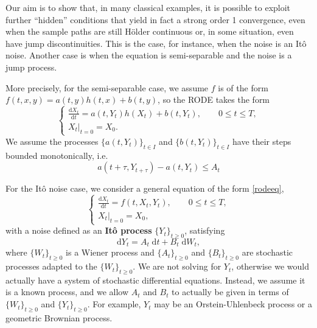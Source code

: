 \documentclass[reqno,12pt]{amsart}
\theoremstyle{plain}%
\theoremstyle{definition}
\begin{document}
Our aim is to show that, in many classical examples, it is possible to exploit further ``hidden'' conditions that yield in fact a strong order 1 convergence, even when the sample paths are still H\"older continuous or, in some situation, even have jump discontinuities. This is the case, for instance, when the noise is an It\^o noise. Another case is when the equation is semi-separable and the noise is a jump process.

More precisely, for the semi-separable case, we assume $f$ is of the form $f(t, x, y) = a(t, y)h(t, x) + b(t, y)$, so the RODE takes the form
\begin{equation}
    \label{semiseparablerodeeq}
    \begin{cases}
        \displaystyle \frac{\mathrm{d}X_t}{\mathrm{d} t} = a(t, Y_t) h(X_t) + b(t, Y_t), \qquad 0 \leq t \leq T, \\
        \left. X_t \right|_{t = 0} = X_0.
    \end{cases}
\end{equation}
We assume the processes $\{a(t, Y_t)\}_{t\in I}$ and $\{b(t, Y_t)\}_{t\in I}$ have their steps bounded monotonically, i.e.
\[
a(t+\tau, Y_{t+\tau}) - a(t, Y_t) \leq A_t
\]



For the It\^o noise case, we consider a general equation of the form \eqref{rodeeq},
\begin{equation}
    \begin{cases}
      \displaystyle \frac{\mathrm{d}X_t}{\mathrm{d} t} = f(t, X_t, Y_t), \qquad 0 \leq t \leq T, \\
      \left. X_t \right|_{t = 0} = X_0,
    \end{cases}
  \end{equation}
with a noise defined as an \textbf{It\^o process} $\{Y_t\}_{t\geq 0}$, satisfying
\begin{equation}
  \label{itoprocess}
  \mathrm{d}Y_t = A_t \;\mathrm{d}t + B_t \;\mathrm{d}W_t,
\end{equation}
where $\{W_t\}_{t\geq 0}$ is a Wiener process and $\{A_t\}_{t \geq 0}$ and $\{B_t\}_{t \geq 0}$ are stochastic processes adapted to the $\{W_t\}_{t\geq 0}$. We are not solving for $Y_t$, otherwise we would actually have a system of stochastic differential equations. Instead, we assume it is a known process, and we allow $A_t$ and $B_t$ to actually be given in terms of $\{W_t\}_{t\geq 0}$ and $\{Y_t\}_{t\geq 0}$. For example, $Y_t$ may be an Orstein-Uhlenbeck process or a geometric Brownian process.
\end{document}

